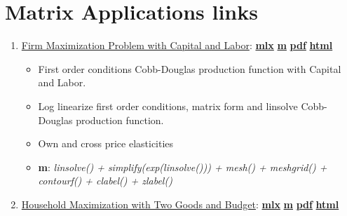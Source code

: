 \documentclass[
]{book}
\providecommand{\tightlist}{%
  \setlength{\itemsep}{0pt}\setlength{\parskip}{0pt}}
\begin{document}
\hypertarget{matrix-applications-links}{%
\section{Matrix Applications links}\label{matrix-applications-links}}

\begin{enumerate}
\def\labelenumi{\arabic{enumi}.}
\tightlist
\item
  \href{https://fanwangecon.github.io/Math4Econ/matrix_application/htmlpdfm/KL_borrowhire_firm.html}{Firm Maximization Problem with Capital and Labor}: \href{https://github.com/FanWangEcon/Math4Econ/blob/master/matrix_application/KL_borrowhire_firm.mlx}{\textbf{mlx}} \textbar{} \href{https://github.com/FanWangEcon/Math4Econ/blob/master/matrix_application/htmlpdfm/KL_borrowhire_firm.m}{\textbf{m}} \textbar{} \href{https://github.com/FanWangEcon/Math4Econ/blob/master/matrix_application/htmlpdfm/KL_borrowhire_firm.pdf}{\textbf{pdf}} \textbar{} \href{https://fanwangecon.github.io/Math4Econ/matrix_application/htmlpdfm/KL_borrowhire_firm.html}{\textbf{html}}

  \begin{itemize}
  \tightlist
  \item
    First order conditions Cobb-Douglas production function with Capital and Labor.
  \item
    Log linearize first order conditions, matrix form and linsolve Cobb-Douglas production function.
  \item
    Own and cross price elasticities
  \item
    \textbf{m}: \emph{linsolve() + simplify(exp(linsolve())) + mesh() + meshgrid() + contourf() + clabel() + zlabel()}
  \end{itemize}
\item
  \href{https://fanwangecon.github.io/Math4Econ/matrix_application/htmlpdfm/twogoods.html}{Household Maximization with Two Goods and Budget}: \href{https://github.com/FanWangEcon/Math4Econ/blob/master/matrix_application/twogoods.mlx}{\textbf{mlx}} \textbar{} \href{https://github.com/FanWangEcon/Math4Econ/blob/master/matrix_application/htmlpdfm/twogoods.m}{\textbf{m}} \textbar{} \href{https://github.com/FanWangEcon/Math4Econ/blob/master/matrix_application/htmlpdfm/twogoods.pdf}{\textbf{pdf}} \textbar{} \href{https://fanwangecon.github.io/Math4Econ/matrix_application/htmlpdfm/twogoods.html}{\textbf{html}}


\end{enumerate}
\end{document}
